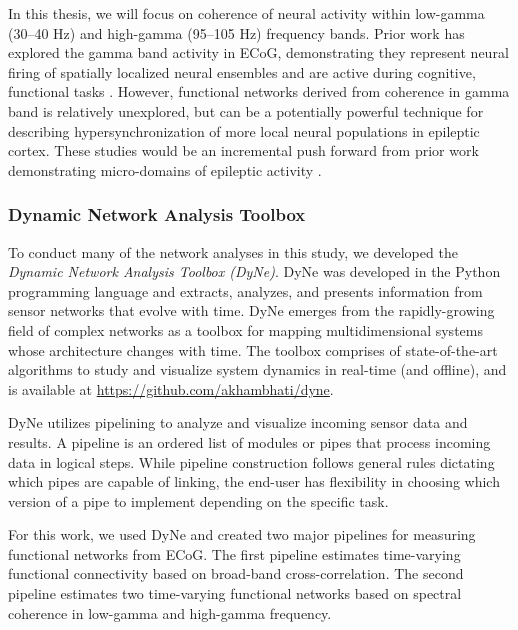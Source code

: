 In this thesis, we will focus on coherence of neural activity within low-gamma (30--40 Hz) and high-gamma (95--105 Hz) frequency bands. Prior work has explored the gamma band activity in ECoG, demonstrating they represent neural firing of spatially localized neural ensembles and are active during cognitive, functional tasks  \cite{crone2006high-frequency}. However, functional networks derived from coherence in gamma band is relatively unexplored, but can be a potentially powerful technique for describing hypersynchronization of more local neural populations in epileptic cortex. These studies would be an incremental push forward from prior work demonstrating micro-domains of epileptic activity \cite{worrell2008high-frequency, schevon2009spatial, stead2010microseizures, viventi2011flexible, feldt_muldoon2013spatially, weiss2013ictal}.

\subsubsection{Dynamic Network Analysis Toolbox}
To conduct many of the network analyses in this study, we developed the \textit{Dynamic Network Analysis Toolbox (DyNe)}. DyNe was developed in the Python programming language and extracts, analyzes, and presents information from sensor networks that evolve with time. DyNe emerges from the rapidly-growing field of complex networks as a toolbox for mapping multidimensional systems whose architecture changes with time. The toolbox comprises of state-of-the-art algorithms to study and visualize system dynamics in real-time (and offline), and is available at \url{https://github.com/akhambhati/dyne}.

DyNe utilizes pipelining to analyze and visualize incoming sensor data and results. A pipeline is an ordered list of modules or pipes that process incoming data in logical steps. While pipeline construction follows general rules dictating which pipes are capable of linking, the end-user has flexibility in choosing which version of a pipe to implement depending on the specific task.

For this work, we used DyNe and created two major pipelines for measuring functional networks from ECoG. The first pipeline estimates time-varying functional connectivity based on broad-band cross-correlation. The second pipeline estimates two time-varying functional networks based on spectral coherence in low-gamma and high-gamma frequency.
